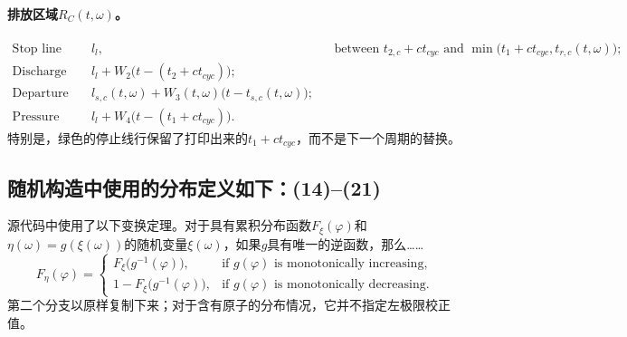 \documentclass{article}
\begin{document}
\paragraph{排放区域\(R_C(t,\omega)\)。}
\begin{align*}
\text{Stop line during green:}\quad &l_l,
&&\text{between }t_{2,c}+ct_{cyc}\text{ and }
\min\bigl(t_1+ct_{cyc},t_{r,c}(t,\omega)\bigr);\\
\text{Discharge wave:}\quad
&l_l+W_2\bigl(t-(t_2+ct_{cyc})\bigr);\\
\text{Departure wave:}\quad
&l_{s,c}(t,\omega)+W_3(t,\omega)\bigl(t-t_{s,c}(t,\omega)\bigr);\\
\text{Pressure wave, if it exists:}\quad
&l_l+W_4\bigl(t-(t_1+ct_{cyc})\bigr).
\end{align*}
特别是，绿色的停止线行保留了打印出来的\(t_1+ct_{cyc}\)，而不是下一个周期的替换。

\subsection*{随机构造中使用的分布定义如下：(14)--(21)}
源代码中使用了以下变换定理。对于具有累积分布函数\(F_\xi(\varphi)\)和\(\eta(\omega)=g(\xi(\omega))\)的随机变量\(\xi(\omega)\)，如果\(g\)具有唯一的逆函数，那么……
\begin{equation}
F_\eta(\varphi)=
\begin{cases}
F_\xi\bigl(g^{-1}(\varphi)\bigr),&\text{if }g(\varphi)\text{ is monotonically increasing},\\
1-F_\xi\bigl(g^{-1}(\varphi)\bigr),&\text{if }g(\varphi)\text{ is monotonically decreasing}.
\end{cases}
\tag{14}
\end{equation}
第二个分支以原样复制下来；对于含有原子的分布情况，它并不指定左极限校正值。
\end{document}
